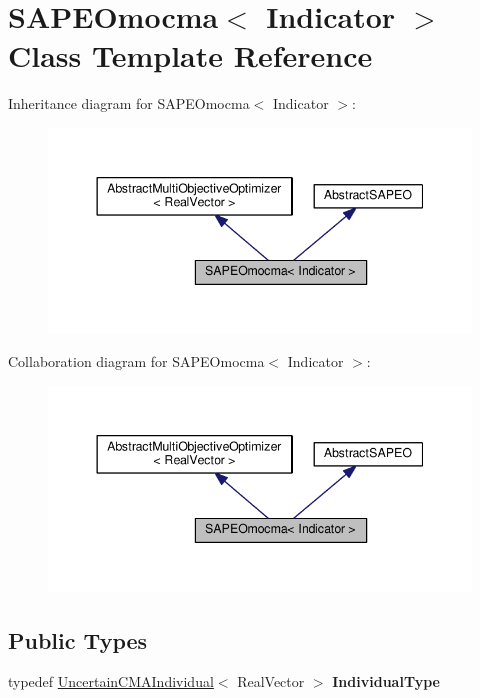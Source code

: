 \hypertarget{classSAPEOmocma}{}\section{S\+A\+P\+E\+Omocma$<$ Indicator $>$ Class Template Reference}
\label{classSAPEOmocma}


Inheritance diagram for S\+A\+P\+E\+Omocma$<$ Indicator $>$\+:\nopagebreak
\begin{figure}[H]
\begin{center}
\leavevmode
\includegraphics[width=344pt]{classSAPEOmocma__inherit__graph}
\end{center}
\end{figure}


Collaboration diagram for S\+A\+P\+E\+Omocma$<$ Indicator $>$\+:\nopagebreak
\begin{figure}[H]
\begin{center}
\leavevmode
\includegraphics[width=344pt]{classSAPEOmocma__coll__graph}
\end{center}
\end{figure}
\subsection*{Public Types}
\begin{DoxyCompactItemize}
\item 
typedef \hyperlink{classUncertainCMAIndividual}{Uncertain\+C\+M\+A\+Individual}$<$ Real\+Vector $>$ {\bfseries Individual\+Type}\hypertarget{classSAPEOmocma_af487b3a27544ae4bc73d1b7ed22308ae}{}\label{classSAPEOmocma_af487b3a27544ae4bc73d1b7ed22308ae}

\end{DoxyCompactItemize}
